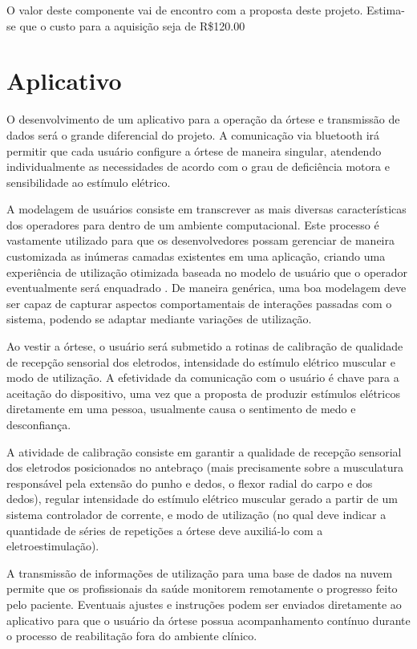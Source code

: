 \documentclass[rascunho,xindy]{fei}
\begin{document}
O valor deste componente vai de encontro com a proposta deste projeto. Estima-se que o custo para a aquisição seja de R\$120.00


\section{Aplicativo}

O desenvolvimento de um aplicativo para a operação da órtese e transmissão de dados será o grande diferencial do projeto. A comunicação via bluetooth irá permitir que cada usuário configure a órtese de maneira singular, atendendo individualmente as necessidades de acordo com o grau de deficiência motora e sensibilidade ao estímulo elétrico.

A modelagem de usuários consiste em transcrever as mais diversas características dos operadores para dentro de um ambiente computacional. Este processo é vastamente utilizado para que os desenvolvedores possam gerenciar de maneira customizada as inúmeras camadas existentes em uma aplicação, criando uma experiência de utilização otimizada baseada no modelo de usuário que o operador eventualmente será enquadrado \cite{fischer2001user}. De maneira genérica, uma boa modelagem deve ser capaz de capturar aspectos comportamentais de interações passadas com o sistema, podendo se adaptar mediante variações de utilização. 

Ao vestir a órtese, o usuário será submetido a rotinas de calibração de qualidade de recepção sensorial dos eletrodos, intensidade do estímulo elétrico muscular e modo de utilização. A efetividade da comunicação com o usuário é chave para a aceitação do dispositivo, uma vez que a proposta de produzir estímulos elétricos diretamente em uma pessoa, usualmente causa o sentimento de medo e desconfiança.

A atividade de calibração consiste em  garantir a qualidade de recepção sensorial dos eletrodos posicionados no antebraço (mais precisamente sobre a musculatura responsável pela extensão do punho e dedos, o flexor radial do carpo e dos dedos), regular intensidade do estímulo elétrico muscular gerado a partir de um sistema controlador de corrente, e modo de utilização (no qual deve indicar a quantidade de séries de repetições a órtese deve auxiliá-lo com a eletroestimulação).

A transmissão de informações de utilização para uma base de dados na nuvem permite que os profissionais da saúde monitorem remotamente o progresso feito pelo paciente. Eventuais ajustes e instruções podem ser enviados diretamente ao aplicativo para que o usuário da órtese possua acompanhamento contínuo durante o processo de reabilitação fora do ambiente clínico. 
\end{document}
